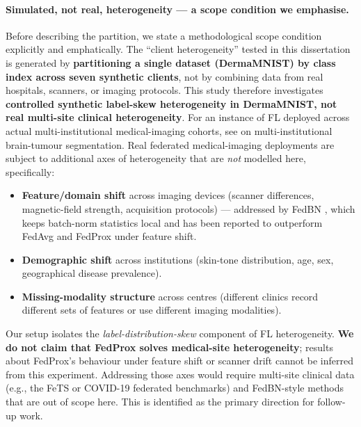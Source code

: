 \documentclass[11pt,a4paper]{article}
\begin{document}
\paragraph{Simulated, not real, heterogeneity --- a scope condition we
emphasise.} Before describing the partition, we state a methodological
scope condition explicitly and emphatically. The ``client heterogeneity''
tested in this dissertation is generated by \textbf{partitioning a single
dataset (DermaMNIST) by class index across seven synthetic clients}, not
by combining data from real hospitals, scanners, or imaging protocols.
This study therefore investigates \textbf{controlled synthetic
label-skew heterogeneity in DermaMNIST, not real multi-site clinical
heterogeneity}.
For an instance of FL deployed across actual multi-institutional
medical-imaging cohorts, see \citet{sheller2020medicalfl} on
multi-institutional brain-tumour segmentation.
Real federated medical-imaging deployments are subject
to additional axes of heterogeneity that are \emph{not} modelled here,
specifically:
\begin{itemize}
\item \textbf{Feature/domain shift} across imaging devices (scanner
differences, magnetic-field strength, acquisition protocols) ---
addressed by FedBN \citep{li2021fedbn}, which keeps batch-norm
statistics local and has been reported to outperform FedAvg and FedProx
under feature shift.
\item \textbf{Demographic shift} across institutions (skin-tone
distribution, age, sex, geographical disease prevalence).
\item \textbf{Missing-modality structure} across centres (different
clinics record different sets of features or use different imaging
modalities).
\end{itemize}
Our setup isolates the \emph{label-distribution-skew} component of FL
heterogeneity. \textbf{We do not claim that FedProx solves
medical-site heterogeneity}; results about FedProx's behaviour under
feature shift or scanner drift cannot be inferred from this experiment.
Addressing those axes would require multi-site clinical data (e.g., the
FeTS or COVID-19 federated benchmarks) and FedBN-style methods that are
out of scope here. This is identified as the primary direction for
follow-up work.
\end{document}
